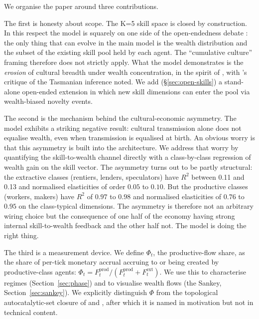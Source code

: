 \documentclass[11pt]{article}
\begin{document}
We organise the paper around three contributions.

The first is honesty about scope. The K=5 skill space is closed by
construction. In this respect the model is squarely on one side of the
open-endedness debate
\citep{taylor2019evolutionary, banzhaf2016defining}: the only thing that
can evolve in the main model is the wealth distribution and the subset
of the existing skill pool held by each agent. The
\citet{henrich2015secret} ``cumulative culture'' framing therefore
does not strictly apply. What the model demonstrates is the
\emph{erosion} of cultural breadth under wealth concentration, in the
spirit of \citet{henrich2004demography}, with
\citet{vaesen2016cumulative}'s critique of the Tasmanian inference
noted. We add (\S\ref{sec:open-skills}) a stand-alone open-ended
extension in which new skill dimensions can enter the pool via
wealth-biased novelty events.

The second is the mechanism behind the cultural-economic asymmetry.
The model exhibits a striking negative result: cultural transmission
alone does not equalise wealth, even when transmission is equalised at
birth. An obvious worry is that this asymmetry is built into the
architecture. We address that worry by quantifying the
skill-to-wealth channel directly with a class-by-class regression of
wealth gain on the skill vector. The asymmetry turns out to be partly
structural: the extractive classes (rentiers, lenders, speculators)
have $R^2$ between 0.11 and 0.13 and normalised elasticities of order
$0.05$ to $0.10$. But the productive classes (workers, makers) have
$R^2$ of $0.97$ to $0.98$ and normalised elasticities of $0.76$ to
$0.95$ on the class-typical dimensions. The asymmetry is therefore
not an arbitrary wiring choice but the consequence of one half of the
economy having strong internal skill-to-wealth feedback and the other
half not. The model is doing the right thing.

The third is a measurement device. We define $\Phi_t$, the
productive-flow share, as the share of per-tick monetary accrual
accruing to or being created by productive-class agents:
$\Phi_t = F^\text{prod}_t / (F^\text{prod}_t + F^\text{ext}_t)$.
We use this to characterise regimes (Section~\ref{sec:phase}) and to
visualise wealth flows (the Sankey, Section~\ref{sec:sankey}). We
explicitly distinguish $\Phi$ from the topological autocatalytic-set
closure of \citet{kauffman1988evolution} and
\citet{hordijk2004detecting}, after which it is named in motivation but
not in technical content.
\end{document}
